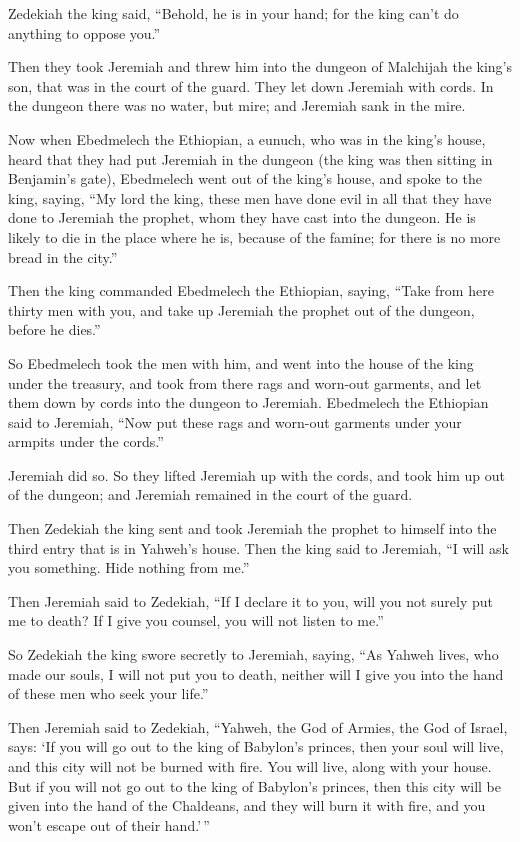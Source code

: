  Zedekiah the king said, ``Behold, he is in your hand; for
the king can't do anything to oppose you.''

 Then they took Jeremiah and threw him into the dungeon of
Malchijah the king's son, that was in the court of the guard. They let
down Jeremiah with cords. In the dungeon there was no water, but mire;
and Jeremiah sank in the mire.

 Now when Ebedmelech the Ethiopian, a eunuch, who was in the
king's house, heard that they had put Jeremiah in the dungeon (the king
was then sitting in Benjamin's gate),  Ebedmelech went out
of the king's house, and spoke to the king, saying,  ``My
lord the king, these men have done evil in all that they have done to
Jeremiah the prophet, whom they have cast into the dungeon. He is likely
to die in the place where he is, because of the famine; for there is no
more bread in the city.''

 Then the king commanded Ebedmelech the Ethiopian, saying,
``Take from here thirty men with you, and take up Jeremiah the prophet
out of the dungeon, before he dies.''

 So Ebedmelech took the men with him, and went into the
house of the king under the treasury, and took from there rags and
worn-out garments, and let them down by cords into the dungeon to
Jeremiah.  Ebedmelech the Ethiopian said to Jeremiah, ``Now
put these rags and worn-out garments under your armpits under the
cords.''

Jeremiah did so.  So they lifted Jeremiah up with the
cords, and took him up out of the dungeon; and Jeremiah remained in the
court of the guard.

 Then Zedekiah the king sent and took Jeremiah the prophet
to himself into the third entry that is in Yahweh's house. Then the king
said to Jeremiah, ``I will ask you something. Hide nothing from me.''

 Then Jeremiah said to Zedekiah, ``If I declare it to you,
will you not surely put me to death? If I give you counsel, you will not
listen to me.''

 So Zedekiah the king swore secretly to Jeremiah, saying,
``As Yahweh lives, who made our souls, I will not put you to death,
neither will I give you into the hand of these men who seek your life.''

 Then Jeremiah said to Zedekiah, ``Yahweh, the God of
Armies, the God of Israel, says: `If you will go out to the king of
Babylon's princes, then your soul will live, and this city will not be
burned with fire. You will live, along with your house. 
But if you will not go out to the king of Babylon's princes, then this
city will be given into the hand of the Chaldeans, and they will burn it
with fire, and you won't escape out of their hand.'\,''

